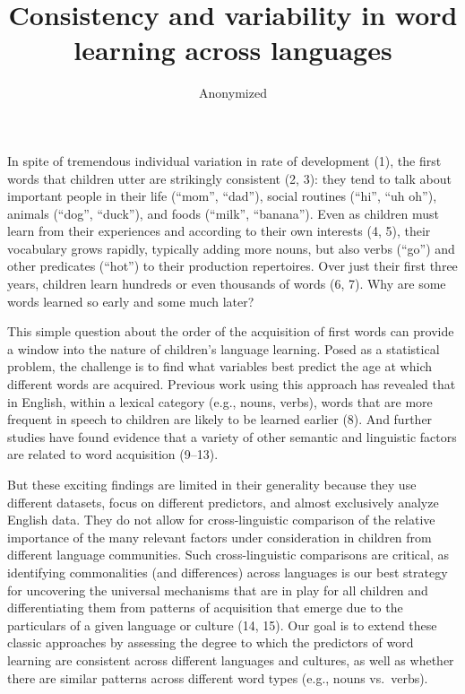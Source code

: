 \documentclass[english,man]{apa6}
\title{Consistency and variability in word learning across languages}
\author{Anonymized}
\affiliation{
    \vspace{0.5cm}
          \textsuperscript{}   }
\theoremstyle{definition}
\theoremstyle{definition}
\theoremstyle{definition}
\theoremstyle{remark}
\begin{document}
\maketitle

\setcounter{secnumdepth}{0}



In spite of tremendous individual variation in rate of development (1),
the first words that children utter are strikingly consistent (2, 3):
they tend to talk about important people in their life (\enquote{mom},
\enquote{dad}), social routines (\enquote{hi}, \enquote{uh oh}), animals
(\enquote{dog}, \enquote{duck}), and foods (\enquote{milk},
\enquote{banana}). Even as children must learn from their experiences
and according to their own interests (4, 5), their vocabulary grows
rapidly, typically adding more nouns, but also verbs (\enquote{go}) and
other predicates (\enquote{hot}) to their production repertoires. Over
just their first three years, children learn hundreds or even thousands
of words (6, 7). Why are some words learned so early and some much
later?

This simple question about the order of the acquisition of first words
can provide a window into the nature of children's language learning.
Posed as a statistical problem, the challenge is to find what variables
best predict the age at which different words are acquired. Previous
work using this approach has revealed that in English, within a lexical
category (e.g., nouns, verbs), words that are more frequent in speech to
children are likely to be learned earlier (8). And further studies have
found evidence that a variety of other semantic and linguistic factors
are related to word acquisition (9--13).

But these exciting findings are limited in their generality because they
use different datasets, focus on different predictors, and almost
exclusively analyze English data. They do not allow for cross-linguistic
comparison of the relative importance of the many relevant factors under
consideration in children from different language communities. Such
cross-linguistic comparisons are critical, as identifying commonalities
(and differences) across languages is our best strategy for uncovering
the universal mechanisms that are in play for all children and
differentiating them from patterns of acquisition that emerge due to the
particulars of a given language or culture (14, 15). Our goal is to
extend these classic approaches by assessing the degree to which the
predictors of word learning are consistent across different languages
and cultures, as well as whether there are similar patterns across
different word types (e.g., nouns vs.~verbs).
\end{document}

